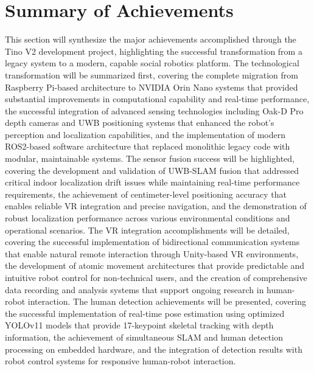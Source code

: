 \section{Summary of Achievements}
This section will synthesize the major achievements accomplished through the Tino V2 development project, highlighting the successful transformation from a legacy system to a modern, capable social robotics platform. The technological transformation will be summarized first, covering the complete migration from Raspberry Pi-based architecture to NVIDIA Orin Nano systems that provided substantial improvements in computational capability and real-time performance, the successful integration of advanced sensing technologies including Oak-D Pro depth cameras and UWB positioning systems that enhanced the robot's perception and localization capabilities, and the implementation of modern ROS2-based software architecture that replaced monolithic legacy code with modular, maintainable systems. The sensor fusion success will be highlighted, covering the development and validation of UWB-SLAM fusion that addressed critical indoor localization drift issues while maintaining real-time performance requirements, the achievement of centimeter-level positioning accuracy that enables reliable VR integration and precise navigation, and the demonstration of robust localization performance across various environmental conditions and operational scenarios. The VR integration accomplishments will be detailed, covering the successful implementation of bidirectional communication systems that enable natural remote interaction through Unity-based VR environments, the development of atomic movement architectures that provide predictable and intuitive robot control for non-technical users, and the creation of comprehensive data recording and analysis systems that support ongoing research in human-robot interaction. The human detection achievements will be presented, covering the successful implementation of real-time pose estimation using optimized YOLOv11 models that provide 17-keypoint skeletal tracking with depth information, the achievement of simultaneous SLAM and human detection processing on embedded hardware, and the integration of detection results with robot control systems for responsive human-robot interaction.

